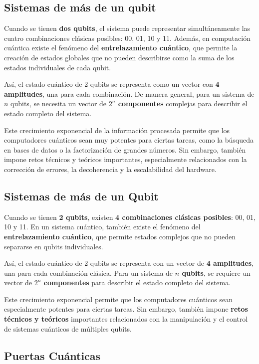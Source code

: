 \documentclass{article}
\begin{document}
\subsection*{Sistemas de más de un qubit}

Cuando se tienen \textbf{dos qubits}, el sistema puede representar simultáneamente las cuatro combinaciones clásicas posibles: 00, 01, 10 y 11. Además, en computación cuántica existe el fenómeno del \textbf{entrelazamiento cuántico}, que permite la creación de estados globales que no pueden describirse como la suma de los estados individuales de cada qubit.

Así, el estado cuántico de 2 qubits se representa como un vector con \textbf{4 amplitudes}, una para cada combinación. De manera general, para un sistema de $n$ qubits, se necesita un vector de \textbf{$2^n$ componentes} complejas para describir el estado completo del sistema.

Este crecimiento exponencial de la información procesada permite que los computadores cuánticos sean muy potentes para ciertas tareas, como la búsqueda en bases de datos o la factorización de grandes números. Sin embargo, también impone retos técnicos y teóricos importantes, especialmente relacionados con la corrección de errores, la decoherencia y la escalabilidad del hardware.

\subsection*{Sistemas de más de un Qubit}

Cuando se tienen \textbf{2 qubits}, existen \textbf{4 combinaciones clásicas posibles}: 00, 01, 10 y 11. En un sistema cuántico, también existe el fenómeno del \textbf{entrelazamiento cuántico}, que permite estados complejos que no pueden separarse en qubits individuales.

Así, el estado cuántico de 2 qubits se representa con un vector de \textbf{4 amplitudes}, una para cada combinación clásica. Para un sistema de \textbf{$n$ qubits}, se requiere un vector de \textbf{$2^n$ componentes} para describir el estado completo del sistema.

Este crecimiento exponencial permite que los computadores cuánticos sean especialmente potentes para ciertas tareas. Sin embargo, también impone \textbf{retos técnicos y teóricos} importantes relacionados con la manipulación y el control de sistemas cuánticos de múltiples qubits.

\subsection*{Puertas Cuánticas}
\end{document}
